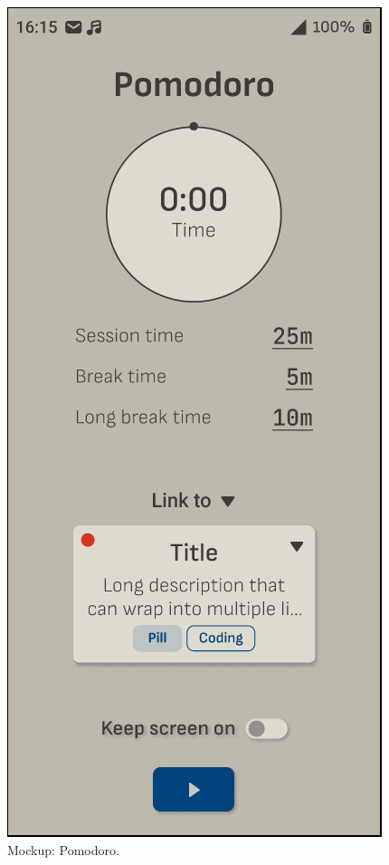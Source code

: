 \begin{figure}[H]
\begin{minipage}{0.48\textwidth}
    \centering
  \end{minipage}\hfill
  \begin{minipage}{0.48\textwidth}
    \caption{Mockup: Pomodoro.}
    \label{fig:mockup_pomodoro}
    \includegraphics[width=\textwidth]{Figuras/mockup_2.png}
    \centering
  \end{minipage}
\end{figure}

